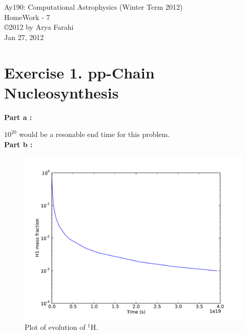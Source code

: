 \documentclass[10pt]{article}
\begin{document}
\begin{center}
{\large Ay190: Computational Astrophysics (Winter Term 2012)} \\
{\large HomeWork - 7 } \\
\copyright 2012 by Arya Farahi \\
Jan 27, 2012
\end{center}

\section{Exercise 1. pp-Chain Nucleosynthesis}


\bfseries{Part a : } \\ \mdseries

 $10^{20}$ would be a resonable end time for this problem. \\

\bfseries{Part b : } \\ \mdseries

\begin{figure}[hbt]
 \centering
 \label{fig:1} \includegraphics[scale=0.3]{Plots/plot1.pdf}
 \caption{ Plot of evolution of $^{1}\mathrm{H}$.}
\end{figure}
\end{document}
